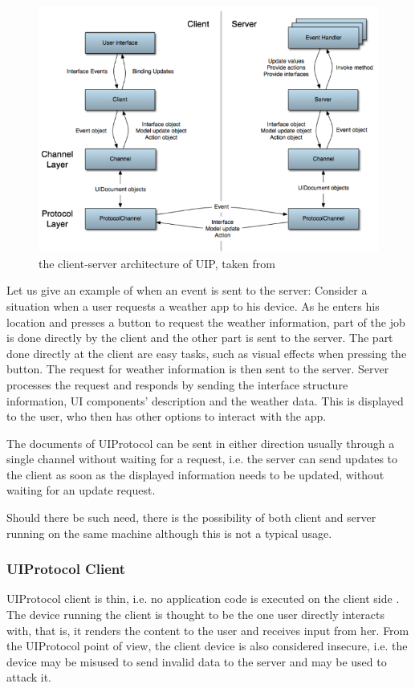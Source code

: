 \begin{figure}[ht!]
\centering
\includegraphics[width=135mm]{pics/UIParchitecture.png}
\caption{the client-server architecture of UIP, taken from \cite{uip}}

\label{fig:UIParchitecture}
\end{figure}
\noindent
Let us give an example of when an event is sent to the server: Consider a situation when a user requests a weather app to his device. As he enters his location and presses a button to request the weather information, part of the job is done directly by the client and the other part is sent to the server. The part done directly at the client are easy tasks, such as visual effects when pressing the button. The request for weather information is then sent to the server. Server processes the request and responds by sending the interface structure information, UI components' description and the weather data. This is displayed to the user, who then has other options to interact with the app.

The documents of UIProtocol can be sent in either direction usually through a single channel without waiting for a request, i.e. the server can send updates to the client as soon as the displayed information needs to be updated, without waiting for an update request.

Should there be such need, there is the possibility of both client and server running on the same machine although this is not a typical usage.

\subsubsection{UIProtocol Client}
UIProtocol client is thin, i.e. no application code is executed on the client side \cite{uip}. The device running the client is thought to be the one user directly interacts with, that is, it renders the content to the user and receives input from her. From the UIProtocol point of view, the client device is also considered insecure, i.e. the device may be misused to send invalid data to the server and may be used to attack it.

